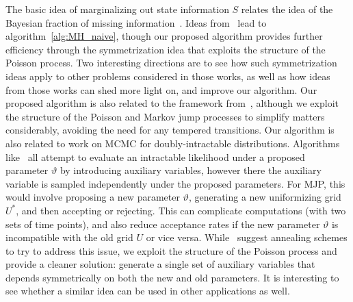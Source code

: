 The basic idea of marginalizing out state information $S$ relates the idea of the Bayesian fraction of missing information~\citep{liu1994fraction}. 
Ideas from~\citet{papaspiliopoulos2007general,yu2011center} lead to algorithm~\ref{alg:MH_naive}, though our proposed algorithm provides further efficiency through the symmetrization idea that exploits the structure of the Poisson process. 
Two interesting directions are to see how such symmetrization ideas apply to other problems considered in those works, as well as how ideas from those works can shed more light on, and improve our algorithm.
Our proposed algorithm is also related to the framework from~\citet{Neal04Drag}, although we exploit the structure of the Poisson and Markov jump processes to simplify matters considerably, avoiding the need for any tempered transitions. 
Our algorithm is also related to work on MCMC for doubly-intractable distributions.  Algorithms like~\cite{Moller2006,murray2006,Andrieu09} all attempt to evaluate an intractable likelihood under a proposed parameter $\vartheta$ by introducing auxiliary variables, however there the auxiliary variable is sampled independently under the proposed parameters. 
For MJP, this would involve proposing a new parameter $\vartheta$, generating a new uniformizing grid $U^*$, and then accepting or rejecting. 
This can complicate computations (with two sets of time points), and also
reduce acceptance rates if the new parameter $\vartheta$ is incompatible with the old grid $U$ or vice versa. 
While~\cite{murray2006} suggest annealing schemes to try to address this issue, we exploit the structure of the Poisson process and provide a cleaner solution: generate a single set of auxiliary variables that depends symmetrically on both the new and old parameters. 
It is interesting to see whether a similar idea can be used in other applications as well.
